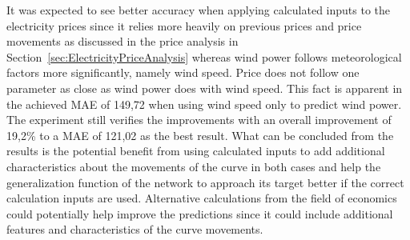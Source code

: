 It was expected to see better accuracy when applying calculated inputs to the electricity prices since it relies more heavily on previous prices and price movements as discussed in the price analysis in Section~\ref{sec:ElectricityPriceAnalysis} whereas wind power follows meteorological factors more significantly, namely wind speed. Price does not follow one parameter as close as wind power does with wind speed. This fact is apparent in the achieved MAE of 149,72 when using wind speed only to predict wind power. The experiment still verifies the improvements with an overall improvement of 19,2\% to a MAE of 121,02 as the best result. What can be concluded from the results is the potential benefit from using calculated inputs to add additional characteristics about the movements of the curve in both cases and help the generalization function of the network to approach its target better if the correct calculation inputs are used. Alternative calculations from the field of economics could potentially help improve the predictions since it could include additional features and characteristics of the curve movements. 